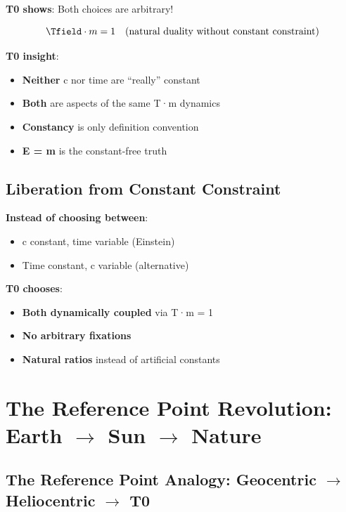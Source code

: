 	\textbf{T0 shows}: Both choices are arbitrary!
	
	\begin{equation}
		\Tfield \cdot m = 1 \quad \text{(natural duality without constant constraint)}
	\end{equation}
	
	\textbf{T0 insight}:
	\begin{itemize}
		\item \textbf{Neither} c nor time are ``really'' constant
		\item \textbf{Both} are aspects of the same T·m dynamics
		\item \textbf{Constancy} is only definition convention
		\item \textbf{E = m} is the constant-free truth
	\end{itemize}
	
	\subsection{Liberation from Constant Constraint}
	
	\textbf{Instead of choosing between}:
	\begin{itemize}
		\item c constant, time variable (Einstein)
		\item Time constant, c variable (alternative)
	\end{itemize}
	
	\textbf{T0 chooses}:
	\begin{itemize}
		\item \textbf{Both dynamically coupled} via T·m = 1
		\item \textbf{No arbitrary fixations}
		\item \textbf{Natural ratios} instead of artificial constants
	\end{itemize}
	
	\section{The Reference Point Revolution: Earth $\rightarrow$ Sun $\rightarrow$ Nature}
	
	\subsection{The Reference Point Analogy: Geocentric $\rightarrow$ Heliocentric $\rightarrow$ T0}
	
